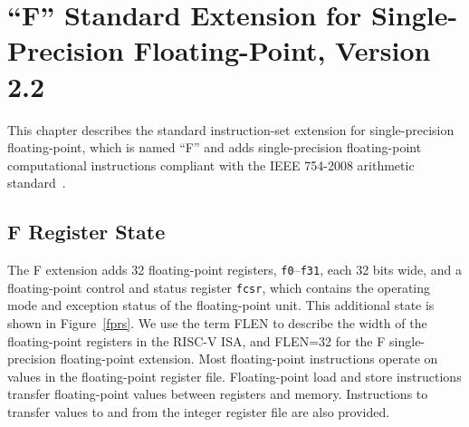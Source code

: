 \chapter{``F'' Standard Extension for Single-Precision Floating-Point,
Version 2.2}
\label{sec:single-float}

This chapter describes the standard instruction-set extension for
single-precision floating-point, which is named ``F'' and adds
single-precision floating-point computational instructions compliant
with the IEEE 754-2008 arithmetic standard~\cite{ieee754-2008}.


\section{F Register State}

The F extension adds 32 floating-point registers, {\tt f0}--{\tt f31},
each 32 bits wide, and a floating-point control and status register
{\tt fcsr}, which contains the operating mode and exception status of the
floating-point unit.  This additional state is shown in
Figure~\ref{fprs}.  We use the term FLEN to describe the width of the
floating-point registers in the RISC-V ISA, and FLEN=32 for the F
single-precision floating-point extension.  Most floating-point
instructions operate on values in the floating-point register file.
Floating-point load and store instructions transfer floating-point
values between registers and memory.  Instructions to transfer values
to and from the integer register file are also provided.


